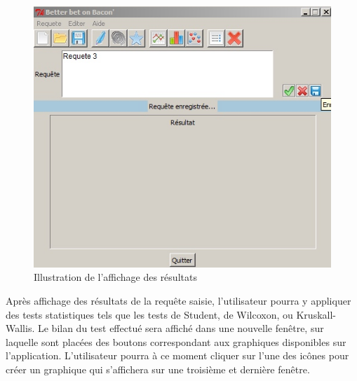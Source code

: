 \documentclass[a4paper,10pt]{report}
\begin{document}
\begin{figure}[H]

\centering
\includegraphics[scale=0.6]{res.jpg}
\caption{Illustration de l'affichage des résultats}

\end{figure}

Après affichage des résultats de la requête saisie, l'utilisateur pourra y appliquer des tests statistiques tels que les tests de Student, de Wilcoxon, ou Kruskall-Wallis. Le bilan du test effectué sera affiché dans une nouvelle fenêtre, sur laquelle sont placées des boutons correspondant aux graphiques disponibles sur l'application. L'utilisateur pourra à ce moment cliquer sur l'une des icônes pour créer un graphique qui s'affichera sur une troisième et dernière fenêtre.
\end{document}
